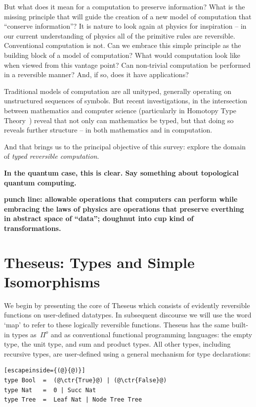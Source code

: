 \documentclass{article}
\newcommand{\amr}[1]{\fbox{Amr says:} \textbf{#1}}
\newcommand{\ctr}[1]{{\scriptsize{\texttt{#1}}}}
\begin{document}
But what does it mean for a computation to preserve information?
What is the missing principle that will guide the creation of a new
model of computation that ``conserve information''?
It is nature to look again at physics for inspiration --
in our current understanding of physics all of the primitive rules
are reversible. Conventional computation is not. Can
we embrace this simple principle as the building block of a model of
computation? What would computation look like when viewed from this
vantage point? Can non-trivial computation be performed in a
reversible manner? And, if so, does it have applications?

Traditional models of computation are all unityped, generally
operating on unstructured sequences of symbols. But recent
investigations, in the intersection between mathematics and
computer science (particularly in Homotopy Type Theory~\cite{hottbook})
reveal that not only can mathematics be typed, but that doing so
reveals further structure -- in both mathematics and in computation.

And that brings us to the principal objective of this survey: explore the
domain of \emph{typed reversible computation}.

\amr{In the quantum case, this is clear. Say something about topological
quantum computing.}

\textbf{punch line: allowable operations that computers can perform
  while embracing the laws of physics are operations that preserve
  everthing in abstract space of ``data''; doughnut into cup kind of
  transformations.}

\section{Theseus: Types and Simple Isomorphisms}
\label{theseusI}

We begin by presenting the core of Theseus which consists of evidently
reversible functions on user-defined datatypes.  In subsequent discourse we
will use the word `map' to refer to these logically reversible
functions. Theseus has the same built-in types as~\ensuremath{\Pi^{o}} and as conventional
functional programming languages: the empty type, the unit type, and sum and
product types. All other types, including recursive types, are user-defined
using a general mechanism for type declarations:

\begin{lstlisting}[escapeinside={(@}{@)}]
type Bool  =  (@\ctr{True}@) | (@\ctr{False}@)
type Nat   =  0 | Succ Nat
type Tree  =  Leaf Nat | Node Tree Tree
 \end{lstlisting}
\end{document}
